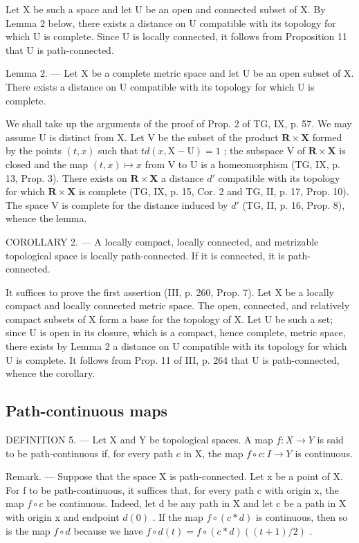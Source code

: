 Let X be such a space and let U be an open and connected subset of X. By Lemma 2 below, there exists a distance on U compatible with its topology for which U is complete. Since U is locally connected, it follows from Proposition 11 that U is path-connected.

Lemma 2. --- Let X be a complete metric space and let U be an open subset of X. There exists a distance on U compatible with its topology for which U is complete.

We shall take up the arguments of the proof of Prop. 2 of TG, IX, p. 57. We may assume U is distinct from X. Let V be the subset of the product \(\mathbf{R} \times \mathbf{X}\) formed by the points \((t,x)\) such that \(td(x,\mathrm{X}-\mathrm{U})=1\) ; the subspace V of \(\mathbf{R} \times \mathbf{X}\) is closed and the map \((t,x) \mapsto x\) from V to U is a homeomorphism (TG, IX, p. 13, Prop. 3). There exists on \(\mathbf{R} \times \mathbf{X}\) a distance \(d'\) compatible with its topology for which \(\mathbf{R} \times \mathbf{X}\) is complete (TG, IX, p. 15, Cor. 2 and TG, II, p. 17, Prop. 10). The space V is complete for the distance induced by \(d'\) (TG, II, p. 16, Prop. 8), whence the lemma.

COROLLARY 2. --- A locally compact, locally connected, and metrizable topological space is locally path-connected. If it is connected, it is path-connected.

It suffices to prove the first assertion (III, p. 260, Prop. 7). Let X be a locally compact and locally connected metric space. The open, connected, and relatively compact subsets of X form a base for the topology of X. Let U be such a set; since U is open in its closure, which is a compact, hence complete, metric space, there exists by Lemma 2 a distance on U compatible with its topology for which U is complete. It follows from Prop. 11 of III, p. 264 that U is path-connected, whence the corollary.

\subsection{Path-continuous maps}

DEFINITION 5. --- Let X and Y be topological spaces. A map \(f: X \to Y\) is said to be path-continuous if, for every path \(c\) in X, the map \(f \circ c: I \to Y\) is continuous.

Remark. --- Suppose that the space X is path-connected. Let x be a point of X. For f to be path-continuous, it suffices that, for every path c with origin x, the map \(f \circ c\) be continuous. Indeed, let d be any path in X and let c be a path in X with origin x and endpoint \(d(0)\) . If the map \(f \circ (c * d)\) is continuous, then so is the map \(f \circ d\) because we have \(f \circ d(t) = f \circ (c * d)((t + 1)/2)\) .

